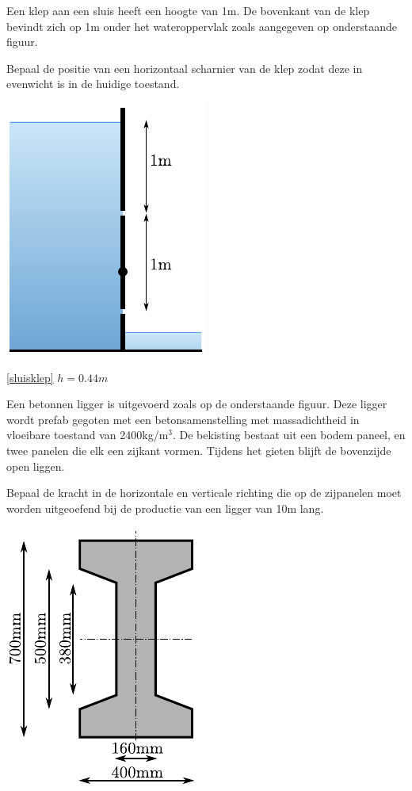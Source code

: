 \begin{toepassing}[*]
	\label{sluisklep}
Een klep aan een sluis heeft een hoogte van 1m. De bovenkant van de klep bevindt zich op 1m onder het wateroppervlak zoals aangegeven op onderstaande figuur.
		
Bepaal de positie van een horizontaal scharnier van de klep zodat deze in evenwicht is in de huidige toestand.

	\centering
	\includegraphics{fig/hydrostatica/sluisklep}
\end{toepassing}
\begin{antwoord}{\ref{sluisklep}}
	$h = 0.44\unit{m}$
\end{antwoord}
\begin{toepassing}[*]
	\label{betonnenligger}
Een betonnen ligger is uitgevoerd zoals op de onderstaande figuur. Deze ligger wordt prefab gegoten met een betonsamenstelling met massadichtheid in vloeibare toestand van 2400kg/m$^3$. De bekisting bestaat uit een bodem paneel, en twee panelen die elk een zijkant vormen. Tijdens het gieten blijft de bovenzijde open liggen.
		
Bepaal de kracht in de horizontale en verticale richting die op de zijpanelen moet worden uitgeoefend bij de productie van een ligger van 10m lang.

	\centering
	\includegraphics{fig/hydrostatica/betonnenligger}
\end{toepassing}

